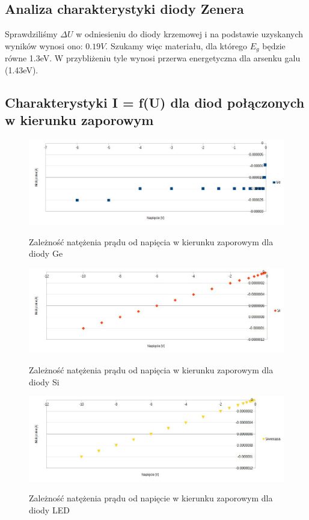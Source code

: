 \documentclass{article}
\begin{document}
\subsection{Analiza charakterystyki diody Zenera}
Sprawdziliśmy $\Delta U$ w odniesieniu do diody krzemowej i na podstawie uzyskanych wyników wynosi ono: $0.19V$. Szukamy więc materiału, dla którego $E_{g}$ będzie równe 1.3eV. W przybliżeniu tyle wynosi przerwa energetyczna dla arsenku galu (1.43eV).

\subsection{Charakterystyki I = f(U) dla diod połączonych w kierunku zaporowym}

\begin{figure}[h]
	\centering
	\includegraphics[scale=0.3]{lab02ch03}
	\label{fig:ch03}
	\caption{Zależność  natężenia prądu od napięcia w kierunku zaporowym dla diody Ge}
\end{figure}

\begin{figure}[h]
	\centering
	\includegraphics[scale=0.3]{lab02ch04}
	\label{fig:ch03}
	\caption{Zależność  natężenia prądu od napięcia w kierunku zaporowym dla diody Si}
\end{figure}

\begin{figure}[h]
	\centering
	\includegraphics[scale=0.3]{lab02ch05}
	\label{fig:ch03}
	\caption{Zależność  natężenia prądu od napięcie w kierunku zaporowym dla diody LED}
\end{figure}
\end{document}
